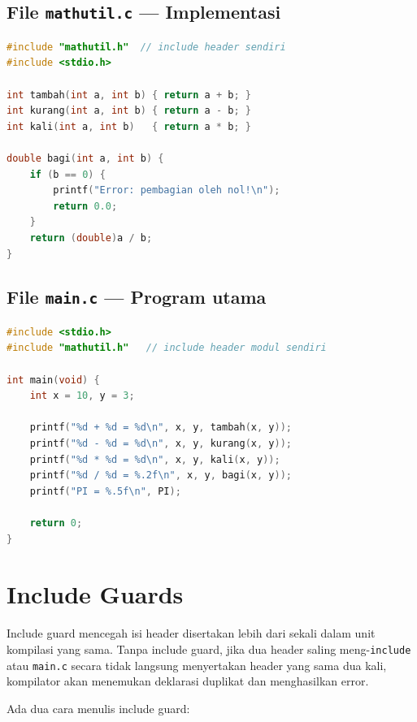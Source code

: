 \documentclass[../main.tex]{subfiles}
\begin{document}
\subsection{File \texttt{mathutil.c} --- Implementasi}

\begin{lstlisting}[language=C,caption=\texttt{mathutil.c} --- definisi fungsi]
#include "mathutil.h"  // include header sendiri
#include <stdio.h>

int tambah(int a, int b) { return a + b; }
int kurang(int a, int b) { return a - b; }
int kali(int a, int b)   { return a * b; }

double bagi(int a, int b) {
    if (b == 0) {
        printf("Error: pembagian oleh nol!\n");
        return 0.0;
    }
    return (double)a / b;
}
\end{lstlisting}

\subsection{File \texttt{main.c} --- Program utama}

\begin{lstlisting}[language=C,caption=\texttt{main.c} menggunakan modul mathutil]
#include <stdio.h>
#include "mathutil.h"   // include header modul sendiri

int main(void) {
    int x = 10, y = 3;
    
    printf("%d + %d = %d\n", x, y, tambah(x, y));
    printf("%d - %d = %d\n", x, y, kurang(x, y));
    printf("%d * %d = %d\n", x, y, kali(x, y));
    printf("%d / %d = %.2f\n", x, y, bagi(x, y));
    printf("PI = %.5f\n", PI);
    
    return 0;
}
\end{lstlisting}

\section{Include Guards}

Include guard mencegah isi header disertakan lebih dari sekali dalam unit kompilasi yang sama. Tanpa include guard, jika dua header saling meng-\texttt{include} atau \texttt{main.c} secara tidak langsung menyertakan header yang sama dua kali, kompilator akan menemukan deklarasi duplikat dan menghasilkan error.

Ada dua cara menulis include guard:
\end{document}
